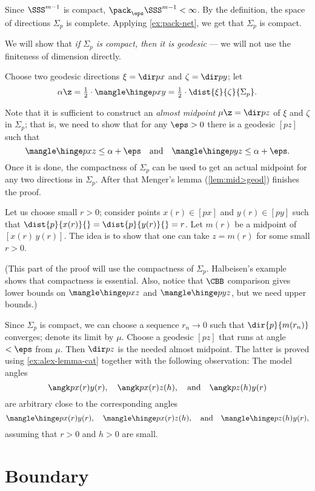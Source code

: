 Since $\SSS^{m-1}$ is compact, $\pack_\eps\SSS^{m-1}<\infty$.
By the definition, the space of directions $\Sigma_p$ is complete. 
Applying \ref{ex:pack-net}, we get that  $\Sigma_p$ is compact.

We will show that \textit{if $\Sigma_p$ is compact, then it is geodesic} --- we will not use the finiteness of dimension directly. 

Choose two geodesic directions $\xi=\dir px$ and $\zeta=\dir py$;
let 
\[\alpha\z=\tfrac12\cdot \mangle \hinge pxy=\tfrac12\cdot \dist{\xi}{\zeta}{\Sigma_p}.\]

Note that it is sufficient to construct an \emph{almost midpoint} $\mu\z=\dir pz$ of $\xi$ and $\zeta$ in $\Sigma_p$;
that is, we need to show that for any $\eps>0$ there is a geodesic $[pz]$ such that
\[\mangle\hinge pxz\le \alpha+\eps
\quad\text{and}\quad
\mangle\hinge pyz\le \alpha+\eps.\]
Once it is done, the compactness of $\Sigma_p$ can be used to get an actual midpoint for any two directions in $\Sigma_p$.
After that Menger's lemma (\ref{lem:mid>geod}) finishes the proof.

Let us choose small $r>0$;
consider points $x(r)\in [px]$ and $y(r)\in [py]$ such that $\dist{p}{x(r)}{}=\dist{p}{y(r)}{}=r$.
Let $m(r)$ be a midpoint of $[x(r)\,y(r)]$.
The idea is to show that one can take $z=m(r)$ for some small $r>0$.%


(This part of the proof will use the compactness of $\Sigma_p$.
Halbeisen's example \cite{alexander-kapovitch-petrunin-bigbook} shows that compactness is essential.
Also, notice that $\CBB$ comparison gives lower bounds on $\mangle\hinge pxz$ and $\mangle\hinge pyz$, but we need upper bounds.)


Since $\Sigma_p$ is compact, we can choose a sequence $r_n\to 0$ such that 
$\dir{p}{m(r_n)}$ converges;
denote its limit by $\mu$.
Choose a geodesic $[pz]$ that runs at angle $<\eps$ from $\mu$.
Then $\dir p{z}$ is the needed almost midpoint.
The latter is proved using \ref{ex:alex-lemma-cat} together with the following observation:
The model angles 
\[\angk p{x(r)}{y(r)},
\quad
\angk p{x(r)}{z(h)},
\quad\text{and}\quad
\angk p{z(h)}{y(r)}
\]
are arbitrary close to the corresponding angles
\[\mangle\hinge p{x(r)}{y(r)},
\quad
\mangle\hinge p{x(r)}{z(h)},
\quad\text{and}\quad
\mangle\hinge p{z(h)}{y(r)},
\]
assuming that $r>0$ and $h>0$ are small.
\qeds


\section{Boundary}

